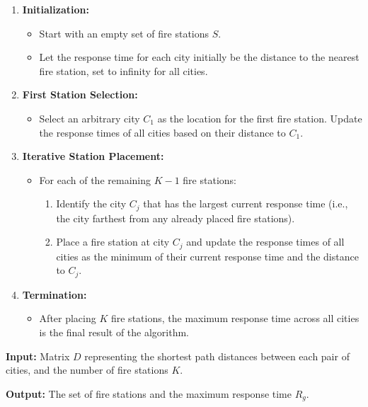 \documentclass[11pt]{article}
\begin{document}
\begin{enumerate}
    \item \textbf{Initialization:}
    \begin{itemize}
        \item Start with an empty set of fire stations \( S \).
        \item Let the response time for each city initially be the distance to the nearest fire station, set to infinity for all cities.
    \end{itemize}

    \item \textbf{First Station Selection:}
    \begin{itemize}
        \item Select an arbitrary city \( C_1 \) as the location for the first fire station. Update the response times of all cities based on their distance to \( C_1 \).
    \end{itemize}

    \item \textbf{Iterative Station Placement:}
    \begin{itemize}
        \item For each of the remaining \( K-1 \) fire stations:
        \begin{enumerate}
            \item Identify the city \( C_j \) that has the largest current response time (i.e., the city farthest from any already placed fire stations).
            \item Place a fire station at city \( C_j \) and update the response times of all cities as the minimum of their current response time and the distance to \( C_j \).
        \end{enumerate}
    \end{itemize}

    \item \textbf{Termination:}
    \begin{itemize}
        \item After placing \( K \) fire stations, the maximum response time across all cities is the final result of the algorithm.
    \end{itemize}
\end{enumerate}

\textbf{Input:} Matrix \( D \) representing the shortest path distances between each pair of cities, and the number of fire stations \( K \).

\textbf{Output:} The set of fire stations and the maximum response time \( R_g \).
\end{document}
